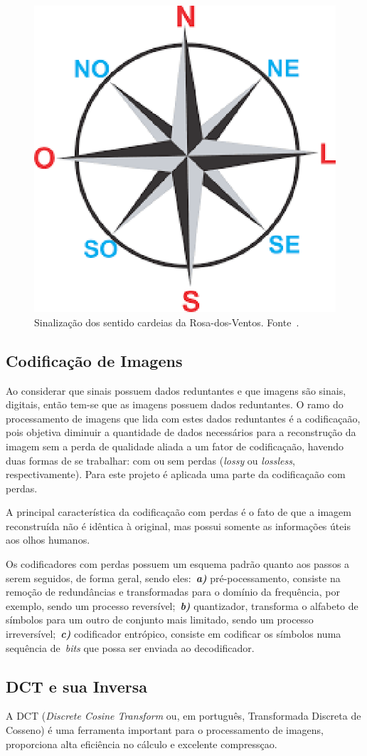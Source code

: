 \documentclass[conference]{Trabalho_3}
\begin{document}
\begin{figure}[!t]
  \centering
  \includegraphics[width = 3.5 cm]{rosadosventos}
  \caption{Sinaliza\c{c}\~ao dos sentido cardeias da Rosa-dos-Ventos. Fonte~\cite{rosadosventos}.}
  \label{fig:rosadosventos}
\end{figure}

\subsection{Codifica\c{c}\~ao de Imagens}
  \label{cod}
Ao considerar que sinais possuem dados reduntantes e que imagens s\~ao sinais, digitais, ent\~ao tem-se que as imagens possuem dados reduntantes. O ramo do processamento de imagens que lida com estes dados reduntantes \'e a codifica\c{c}a\~ao, pois objetiva diminuir a quantidade de dados necess\'arios para a reconstru\c{c}\~ao da imagem sem a perda de qualidade aliada a um fator de codifica\c{c}a\~ao, havendo duas formas de se trabalhar: com ou sem perdas (\textit{lossy} ou \textit{lossless}, respectivamente). Para este projeto \'e aplicada uma parte da codifica\c{c}a\~ao com perdas.

A principal caracter\'istica da codifica\c{c}a\~ao com perdas \'e o fato de que a imagem reconstru\'ida n\~ao \'e id\^entica \`a original, mas possui somente as informa\c{c}\~oes \'uteis aos olhos humanos.

Os codificadores com perdas possuem um esquema padr\~ao quanto aos passos a serem seguidos, de forma geral, sendo eles:~\textit{\textbf{a)}} pr\'e-pocessamento, consiste na remo\c{c}\~ao de redund\^ancias e transformadas para o dom\'inio da frequ\^encia, por exemplo, sendo um processo revers\'ivel;~\textit{\textbf{b)}} quantizador, transforma o alfabeto de s\'imbolos para um outro de conjunto mais limitado, sendo um processo irrevers\'ivel;~\textit{\textbf{c)}} codificador entr\'opico, consiste em codificar os s\'imbolos numa sequ\^encia de~\textit{bits} que possa ser enviada ao decodificador.

\subsection{DCT e sua Inversa}
  \label{dct}
A DCT (\textit{Discrete Cosine Transform} ou, em portugu\^es, Transformada Discreta de Cosseno) \'e uma ferramenta important para o processamento de imagens, proporciona alta efici\^encia no c\'alculo e excelente compress\c{c}ao.
\end{document}
